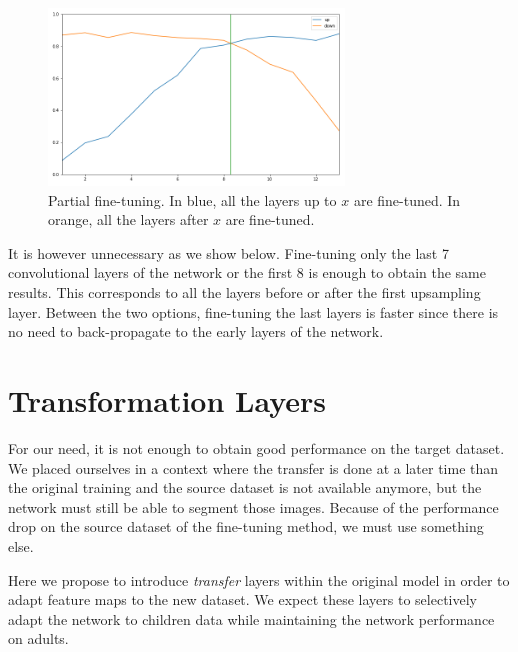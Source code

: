 \begin{figure}[htb]
    \centering
	\includegraphics[width=0.7\textwidth]{img_transfer/partial_transfer}
    \caption{Partial fine-tuning. In blue, all the layers up to $x$ are fine-tuned. In orange, all the layers after $x$ are fine-tuned.}
    \label{fig:partial_transfer}
\end{figure}

It is however unnecessary as we show below. Fine-tuning only the last 7 convolutional layers of the network or the first 8 is enough to obtain the same results. This corresponds to all the layers before or after the first upsampling layer. Between the two options, fine-tuning the last layers is faster since there is no need to back-propagate to the early layers of the network.

\section{Transformation Layers}
\label{sec:transfo}

For our need, it is not enough to obtain good performance on the target dataset. We placed ourselves in a context where the transfer is done at a later time than the original training and the source dataset is not available anymore, but the network must still be able to segment those images. Because of the performance drop on the source dataset of the fine-tuning method, we must use something else.

Here we propose to introduce \textit{transfer} layers within the original model in order to adapt feature maps to the new dataset. We expect these layers to selectively adapt the network to children data while maintaining the network performance on adults.


